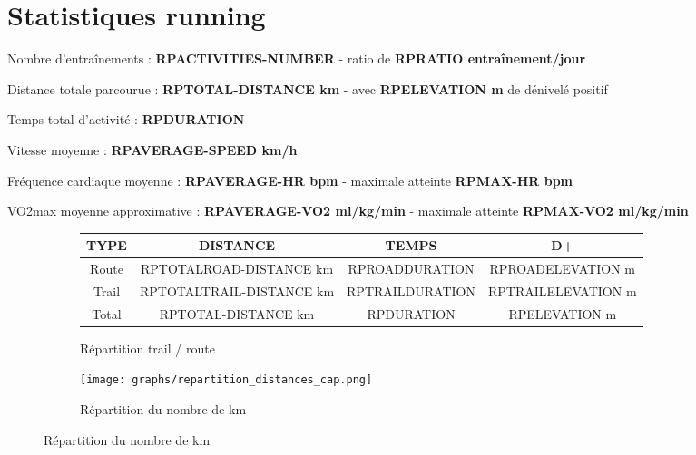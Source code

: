 \documentclass[a4paper,french,11pt]{report}
\begin{document}

\section*{Statistiques running}
\thispagestyle{empty}


\textbullet Nombre d'entraînements : \textbf{RPACTIVITIES-NUMBER} -
ratio de \textbf{RPRATIO entraînement/jour}

\textbullet Distance totale parcourue : \textbf{RPTOTAL-DISTANCE km} -
avec \textbf{RPELEVATION m} de dénivelé positif

\textbullet Temps total d'activité : \textbf{RPDURATION}

\textbullet Vitesse moyenne : \textbf{RPAVERAGE-SPEED km/h}

\textbullet Fréquence cardiaque moyenne : \textbf{RPAVERAGE-HR bpm} -
maximale atteinte \textbf{RPMAX-HR bpm}

\textbullet VO2max moyenne approximative : \textbf{RPAVERAGE-VO2 ml/kg/min} -
maximale atteinte \textbf{RPMAX-VO2 ml/kg/min}

\begin{figure}[!ht]
	\begin{subfigure}{.49\linewidth}
	
	\centering
	
	\begin{tabular}{|c|c|c|c|}
		\hline
		\textbf{TYPE}         & \textbf{DISTANCE}                & \textbf{TEMPS}           & \textbf{D+}           \\ \hline
		Route        & RPTOTALROAD-DISTANCE km & RPROADDURATION & RPROADELEVATION m  \\ \hline
		Trail & RPTOTALTRAIL-DISTANCE km   & RPTRAILDURATION    & RPTRAILELEVATION m    \\ \hline
		Total        & RPTOTAL-DISTANCE km     & RPDURATION      & RPELEVATION m \\ \hline
		\end{tabular}
		\caption*{Répartition trail / route}

	\end{subfigure}\hfill
	\begin{subfigure}{.49\linewidth}
	
	\centering
	
	\texttt{[image: graphs/repartition\_distances\_cap.png]}
	\caption*{Répartition du nombre de km}
	
	\end{subfigure}
	
	\end{figure}
\end{document}
